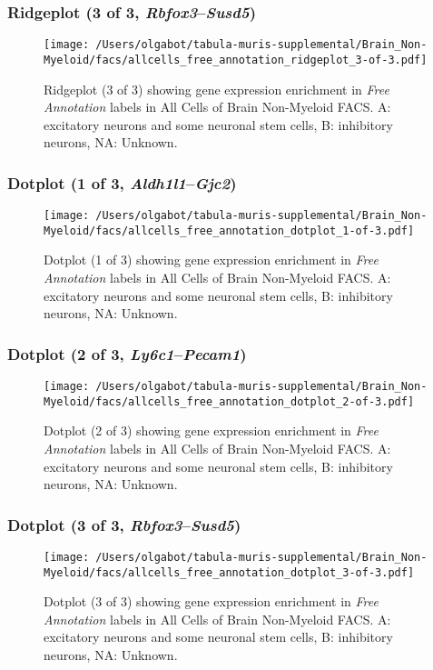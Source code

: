 \subsubsection{Ridgeplot (3 of 3, \emph{Rbfox3}--\emph{Susd5})}
\begin{figure}[h]
\centering
\texttt{[image: /Users/olgabot/tabula-muris-supplemental/Brain\_Non-Myeloid/facs/allcells\_free\_annotation\_ridgeplot\_3-of-3.pdf]}

\caption{ Ridgeplot (3 of 3)  showing gene expression enrichment in \emph{Free Annotation} labels in All Cells of Brain Non-Myeloid FACS. A: excitatory neurons and some neuronal stem cells, B: inhibitory neurons, NA: Unknown.}
\end{figure}


\clearpage

\subsubsection{Dotplot (1 of 3, \emph{Aldh1l1}--\emph{Gjc2})}
\begin{figure}[h]
\centering
\texttt{[image: /Users/olgabot/tabula-muris-supplemental/Brain\_Non-Myeloid/facs/allcells\_free\_annotation\_dotplot\_1-of-3.pdf]}

\caption{ Dotplot (1 of 3)  showing gene expression enrichment in \emph{Free Annotation} labels in All Cells of Brain Non-Myeloid FACS. A: excitatory neurons and some neuronal stem cells, B: inhibitory neurons, NA: Unknown.}
\end{figure}


\clearpage

\subsubsection{Dotplot (2 of 3, \emph{Ly6c1}--\emph{Pecam1})}
\begin{figure}[h]
\centering
\texttt{[image: /Users/olgabot/tabula-muris-supplemental/Brain\_Non-Myeloid/facs/allcells\_free\_annotation\_dotplot\_2-of-3.pdf]}

\caption{ Dotplot (2 of 3)  showing gene expression enrichment in \emph{Free Annotation} labels in All Cells of Brain Non-Myeloid FACS. A: excitatory neurons and some neuronal stem cells, B: inhibitory neurons, NA: Unknown.}
\end{figure}


\clearpage

\subsubsection{Dotplot (3 of 3, \emph{Rbfox3}--\emph{Susd5})}
\begin{figure}[h]
\centering
\texttt{[image: /Users/olgabot/tabula-muris-supplemental/Brain\_Non-Myeloid/facs/allcells\_free\_annotation\_dotplot\_3-of-3.pdf]}

\caption{ Dotplot (3 of 3)  showing gene expression enrichment in \emph{Free Annotation} labels in All Cells of Brain Non-Myeloid FACS. A: excitatory neurons and some neuronal stem cells, B: inhibitory neurons, NA: Unknown.}
\end{figure}


